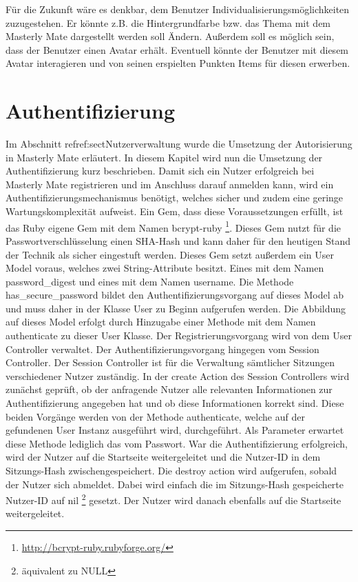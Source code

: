 Für die Zukunft wäre es denkbar, dem Benutzer Individualisierungsmöglichkeiten
zuzugestehen. Er könnte z.B. die Hintergrundfarbe bzw. das Thema mit dem
Masterly Mate dargestellt werden soll Ändern. Außerdem soll es möglich sein,
dass der Benutzer einen Avatar erhält. Eventuell könnte der Benutzer mit diesem
Avatar interagieren und von seinen erspielten Punkten Items für diesen erwerben. 

\section{Authentifizierung}\label{ref:sectAuthentifizierung}
Im Abschnitt ref{ref:sectNutzerverwaltung} wurde die Umsetzung der Autorisierung
in Masterly Mate erläutert. In diesem Kapitel wird nun die Umsetzung der
Authentifizierung kurz beschrieben. Damit sich ein Nutzer erfolgreich bei
Masterly Mate registrieren und im Anschluss darauf anmelden kann, wird ein
Authentifizierungsmechanismus benötigt, welches sicher und zudem eine geringe
Wartungskomplexität aufweist. Ein Gem, dass diese Voraussetzungen erfüllt, ist
das Ruby eigene Gem mit dem Namen bcrypt-ruby
\footnote{\url{http://bcrypt-ruby.rubyforge.org/}}. Dieses Gem nutzt für die
Passwortverschlüsselung einen SHA-Hash und kann daher für den
heutigen Stand der Technik als sicher eingestuft werden. Dieses Gem setzt
außerdem ein User Model voraus, welches zwei String-Attribute besitzt. Eines mit
dem Namen password\_digest und eines mit dem Namen username. Die Methode
has\_secure\_password bildet den Authentifizierungsvorgang auf dieses Model ab
und muss daher in der Klasse User zu Beginn aufgerufen werden. Die Abbildung auf
dieses Model erfolgt durch Hinzugabe einer Methode mit dem Namen authenticate zu
dieser User Klasse. Der Registrierungsvorgang wird von dem User Controller
verwaltet. Der Authentifizierungsvorgang hingegen vom Session Controller. Der
Session Controller ist für die Verwaltung sämtlicher Sitzungen verschiedener Nutzer
zuständig. In der create Action des Session Controllers wird zunächst geprüft,
ob der anfragende Nutzer alle relevanten Informationen zur Authentifizierung
angegeben hat und ob diese Informationen korrekt sind. Diese beiden Vorgänge
werden von der Methode authenticate, welche auf der gefundenen User
Instanz ausgeführt wird, durchgeführt. Als Parameter erwartet diese Methode lediglich
das vom Passwort. War die Authentifizierung erfolgreich, wird der Nutzer auf die
Startseite weitergeleitet und die Nutzer-ID in dem
Sitzungs-Hash zwischengespeichert. Die destroy action wird aufgerufen, sobald
der Nutzer sich abmeldet. Dabei wird einfach die im Sitzungs-Hash gespeicherte
Nutzer-ID auf nil \footnote{äquivalent zu NULL} gesetzt. Der Nutzer wird danach
ebenfalls auf die Startseite weitergeleitet. 

